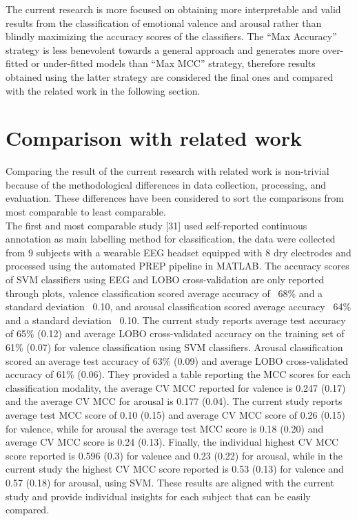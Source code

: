 The current research is more focused on obtaining more interpretable and valid results from the classification of emotional valence and arousal rather than blindly maximizing the accuracy scores of the classifiers. The “Max Accuracy” strategy is less benevolent towards a general approach and generates more over-fitted or under-fitted models than “Max MCC” strategy, therefore results obtained using the latter strategy are considered the final ones and compared with the related work in the following section.

\section{Comparison with related work}
Comparing the result of the current research with related work is non-trivial because of the methodological differences in data collection, processing, and evaluation. These differences have been considered to sort the comparisons from most comparable to least comparable. 
\\
The first and most comparable study [31] used self-reported continuous annotation as main labelling method for classification, the data were collected from 9 subjects with a wearable EEG headset equipped with 8 dry electrodes and processed using the automated PREP pipeline in MATLAB. The accuracy scores of SVM classifiers using EEG and LOBO cross-validation are only reported through plots, valence classification scored average accuracy of ~68\% and a standard deviation ~0.10, and arousal classification scored average accuracy ~64\% and a standard deviation ~0.10. The current study reports average test accuracy of 65\% (0.12) and average LOBO cross-validated accuracy on the training set of 61\% (0.07) for valence classification using SVM classifiers. Arousal classification scored an average test accuracy of 63\% (0.09) and average LOBO cross-validated accuracy of 61\% (0.06). They provided a table reporting the MCC scores for each classification modality, the average CV MCC reported for valence is 0.247 (0.17) and the average CV MCC for arousal is 0.177 (0.04). The current study reports average test MCC score of 0.10 (0.15) and average CV MCC score of 0.26 (0.15) for valence, while for arousal the average test MCC score is 0.18 (0.20) and average CV MCC score is 0.24 (0.13). Finally, the individual highest CV MCC score reported is 0.596 (0.3) for valence and 0.23 (0.22) for arousal, while in the current study the highest CV MCC score reported is 0.53 (0.13) for valence and 0.57 (0.18) for arousal, using SVM. These results are aligned with the current study and provide individual insights for each subject that can be easily compared.

